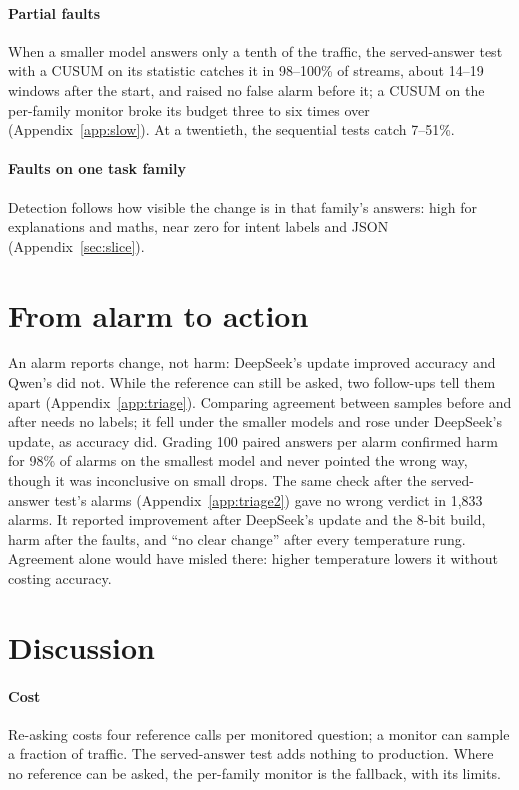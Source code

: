 \documentclass[11pt]{article}
\begin{document}
\paragraph{Partial faults} When a smaller model answers only a tenth of the
traffic, the served-answer test with a CUSUM on its statistic catches it in
98--100\% of streams, about 14--19 windows after the start, and raised no false
alarm before it; a CUSUM on the per-family monitor broke its budget three to six
times over (Appendix~\ref{app:slow}). At a twentieth, the sequential tests catch 7--51\%.

\paragraph{Faults on one task family} Detection follows how visible the change is
in that family's answers: high for explanations and maths, near zero for intent
labels and JSON (Appendix~\ref{sec:slice}).

\section{From alarm to action}
\label{sec:discussion}

An alarm reports change, not harm: DeepSeek's update improved accuracy and
Qwen's did not. While the reference can still be asked, two follow-ups tell them
apart (Appendix~\ref{app:triage}). Comparing agreement between samples before and
after needs no labels; it fell under the smaller models and rose under DeepSeek's
update, as accuracy did. Grading 100 paired answers per alarm confirmed harm for 98\% of
alarms on the smallest model and never pointed the wrong way, though it was
inconclusive on small drops. The same check after the served-answer test's alarms
(Appendix~\ref{app:triage2}) gave no wrong verdict in 1{,}833 alarms. It reported
improvement after DeepSeek's update and the 8-bit build, harm after the faults,
and ``no clear change'' after every temperature rung. Agreement alone would have
misled there: higher temperature lowers it without costing accuracy.

\section{Discussion}

\paragraph{Cost} Re-asking costs four reference calls per monitored question; a
monitor can sample a fraction of traffic. The served-answer test adds nothing to
production. Where no reference can be asked, the per-family monitor is the
fallback, with its limits.
\end{document}

